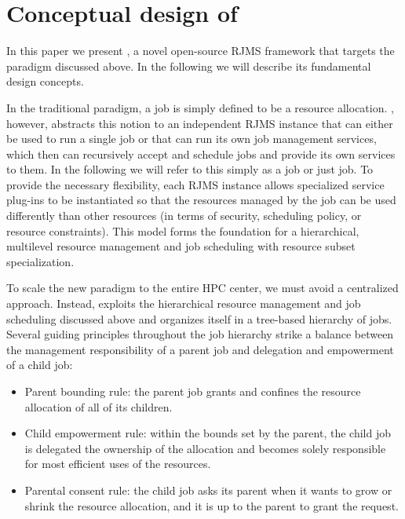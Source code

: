 \section{Conceptual design of \flux}
\label{models}

In this paper we present \flux, a novel open-source RJMS framework that
targets the paradigm discussed above. In the following
we will describe its
%
fundamental design
concepts.

\vspace{1ex}
 In the traditional paradigm, 
a job is simply defined to be a resource allocation. 
\flux, however, abstracts this notion to an independent 
RJMS instance that can either be used to run a single job
or that can 
run its own job management services,
which then can recursively accept and schedule jobs and provide its own 
services to them. 
In the following we will refer to this simply as a \flux job or just job.
To provide the necessary flexibility,
each RJMS instance 
allows specialized service
plug-ins to be instantiated so that the resources managed by the job
can be used differently than other resources (in terms of security, scheduling policy, or resource constraints).
This model forms 
the foundation for a hierarchical,
multilevel resource management and job scheduling
with resource subset specialization.

\vspace{1ex}
 To scale the new paradigm 
to the entire HPC center, we must avoid a centralized approach. 
Instead, \flux exploits the hierarchical resource management 
and job scheduling discussed above and organizes itself in a tree-based hierarchy of \flux jobs. 
Several guiding principles throughout the job hierarchy strike 
a balance between the management responsibility 
of a parent job and delegation and empowerment of a child job:

\begin{itemize}
\item{Parent bounding rule: the parent job grants 
and confines the resource allocation of all of its children.}

\item{Child empowerment rule: within the bounds set 
by the parent, the child job is delegated the ownership 
of the allocation and becomes solely responsible 
for most efficient uses of the resources.}

\item{Parental consent rule: the child job asks 
its parent when it wants to grow or shrink the resource 
allocation, and it is up to the parent to grant the request.}
\end{itemize}

